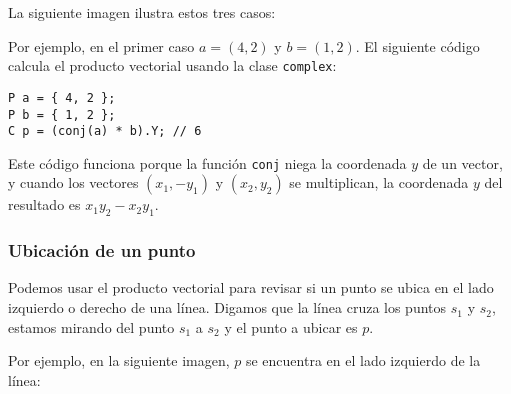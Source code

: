 La siguiente imagen ilustra estos tres casos:
\begin{center}
\end{center}

\noindent
Por ejemplo, en el primer caso $a=(4,2)$ y $b=(1,2)$. El siguiente código
calcula el producto vectorial usando la clase \texttt{complex}:

\begin{lstlisting}
P a = { 4, 2 };
P b = { 1, 2 };
C p = (conj(a) * b).Y; // 6
\end{lstlisting}

Este código funciona porque la función \texttt{conj} niega la coordenada $y$
de un vector, y cuando los vectores $(x_1,-y_1)$ y $(x_2,y_2)$ se multiplican,
la coordenada $y$ del resultado es $x_1 y_2 - x_2 y_1$.

\subsubsection{Ubicación de un punto}

Podemos usar el producto vectorial para revisar si un punto se ubica en
el lado izquierdo o derecho de una línea. Digamos que la línea cruza los puntos
$s_1$ y $s_2$, estamos mirando del punto $s_1$ a $s_2$ y el punto a ubicar
es $p$.

Por ejemplo, en la siguiente imagen, $p$ se encuentra en el lado izquierdo
de la línea:
\begin{center}
\end{center}

